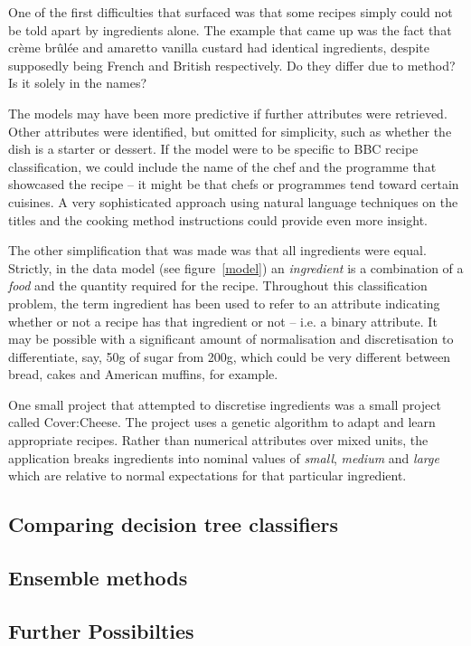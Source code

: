 \documentclass[11pt,a4paper]{article}
\begin{document}
One of the first difficulties that surfaced was that some recipes simply could not
be told apart by ingredients alone. The example that came up was the fact that
cr\`eme br\^ul\'ee and amaretto vanilla custard had identical ingredients, despite
supposedly being French and British respectively. Do they differ due to method? Is
it solely in the names?

The models may have been more predictive if further attributes were retrieved.
Other attributes were identified, but omitted for simplicity, such as whether
the dish is a starter or dessert. If the model were to be specific to BBC recipe
classification, we could include the name of the chef and the programme
that showcased the recipe -- it might be that chefs or programmes tend toward
certain cuisines. A very sophisticated approach using natural language techniques
on the titles and the cooking method instructions could provide even more
insight.

The other simplification that was made was that all ingredients were equal. Strictly,
in the data model (see figure~\ref{model}) an \emph{ingredient} is a combination of a
\emph{food} and the quantity required for the recipe. Throughout this classification
problem, the term ingredient has been used to refer to an attribute indicating
whether or not a recipe has that ingredient or not -- i.e. a binary attribute. It may
be possible with a significant amount of normalisation and discretisation to
differentiate, say, 50g of sugar from 200g, which could be very different between
bread, cakes and American muffins, for example.

One small project that attempted to discretise ingredients was a small project
called Cover:Cheese. \cite{covercheese} The project uses a genetic algorithm
to adapt and learn appropriate recipes. Rather than numerical attributes over
mixed units, the application breaks ingredients into nominal values of \emph{small},
\emph{medium} and \emph{large} which are relative to normal expectations for
that particular ingredient.

\subsection{Comparing decision tree classifiers}

\subsection{Ensemble methods}

\subsection{Further Possibilties}



\end{document}
